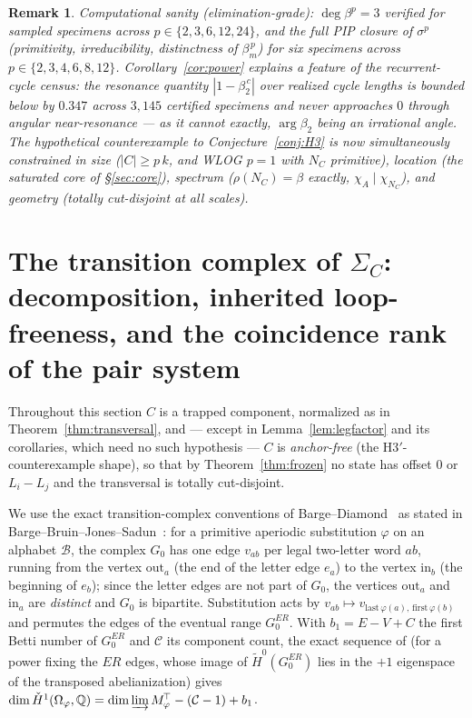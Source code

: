 \documentclass[11pt]{article}
\newtheorem{remark}[theorem]{Remark}
\begin{document}
\begin{remark}\label{rem:powerverif}
Computational sanity (elimination-grade): $\deg\beta^p=3$ verified for
sampled specimens across $p\in\{2,3,6,12,24\}$, and the full PIP
closure of $\sigma^p$ (primitivity, irreducibility, distinctness of
$\beta_m^{\,p}$) for six specimens across $p\in\{2,3,4,6,8,12\}$.
Corollary~\ref{cor:power} explains a feature of the recurrent-cycle
census: the resonance quantity $|1-\beta_2^{\,c}|$ over realized cycle
lengths is bounded below by $0.347$ across $3{,}145$ certified
specimens and never approaches $0$ through angular near-resonance ---
as it cannot exactly, $\arg\beta_2$ being an irrational angle. The
hypothetical counterexample to Conjecture~\ref{conj:H3} is now
simultaneously constrained in size ($|C|\ge p\,k$, and WLOG $p=1$ with
$N_C$ primitive), location (the saturated core of \S\ref{sec:core}),
spectrum ($\rho(N_C)=\beta$ exactly, $\chi_A\mid\chi_{N_C}$), and
geometry (totally cut-disjoint at all scales).
\end{remark}

\section{The transition complex of $\Sigma_C$: decomposition, inherited
loop-freeness, and the coincidence rank of the pair system}\label{sec:trans}

Throughout this section $C$ is a trapped component, normalized as in
Theorem~\ref{thm:transversal}, and --- except in
Lemma~\ref{lem:legfactor} and its corollaries, which need no such
hypothesis --- $C$ is \emph{anchor-free} (the H3$'$-counterexample
shape), so that by Theorem~\ref{thm:frozen} no state has offset $0$ or
$L_i-L_j$ and the transversal is totally cut-disjoint.

We use the exact transition-complex conventions of
Barge--Diamond~\cite{BD08} as stated in
Barge--Bruin--Jones--Sadun~\cite{BBJS12}: for a primitive aperiodic
substitution $\varphi$ on an alphabet $\mathcal B$, the complex $G_0$
has one edge $v_{ab}$ per legal two-letter word $ab$, running from the
vertex $\mathrm{out}_a$ (the end of the letter edge $e_a$) to the
vertex $\mathrm{in}_b$ (the beginning of $e_b$); since the letter
edges are not part of $G_0$, the vertices $\mathrm{out}_a$ and
$\mathrm{in}_a$ are \emph{distinct} and $G_0$ is bipartite.
Substitution acts by $v_{ab}\mapsto
v_{\mathrm{last}\,\varphi(a),\,\mathrm{first}\,\varphi(b)}$ and
permutes the edges of the eventual range $G_0^{ER}$. With $b_1=E-V+C$
the first Betti number of $G_0^{ER}$ and $\mathcal C$ its component
count, the exact sequence of \cite{BD08,BBJS12} (for a power fixing
the $ER$ edges, whose image of $\widetilde H^0(G_0^{ER})$ lies in the
$+1$ eigenspace of the transposed abelianization) gives
$\dim\check H^1(\Omega_\varphi,\mathbb Q)=\dim\varinjlim
M_\varphi^{\!\top}-(\mathcal C-1)+b_1$.
\end{document}
